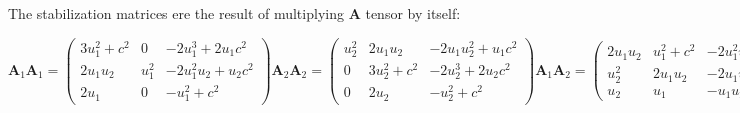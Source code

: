 \documentclass[a4paper,12pt]{article}
\begin{document}
The stabilization matrices ere the result of multiplying $\mathbf{A}$ tensor by itself:

\begin{subequations}
\begin{equation}
\mathbf{A}_1\mathbf{A}_1 =
\begin{pmatrix}
3u_1^2 + c^2 & 0  & -2u_1^3 + 2u_1c^2 \\
2u_1u_2  & u_1^2  & -2u_1^2u_2 + u_2c^2 \\
2u_1  & 0   & -u_1^2 + c^2
\end{pmatrix}
\end{equation}
\begin{equation}
    \mathbf{A}_2\mathbf{A}_2 =
\begin{pmatrix}
u_2^2  & 2u_1u_2  & -2u_1u_2^2 + u_1c^2 \\
0    & 3u_2^2 + c^2 & -2u_2^3 + 2u_2c^2 \\
0  & 2u_2  & -u_2^2 + c^2
\end{pmatrix}
\end{equation}
\begin{equation}
\mathbf{A}_1\mathbf{A}_2 =
\begin{pmatrix}
2u_1u_2  & u_1^2 + c^2  & -2u_1^2u_2 \\
u_2^2  & 2u_1u_2  & -2u_1u_2^2 + u_1c^2 \\
u_2  & u_1  & -u_1u_2
\end{pmatrix}
\end{equation}
\begin{equation}
\mathbf{A}_2\mathbf{A}_1 =
\begin{pmatrix}
2u_1u_2  & u_1^2  & -2u_1^2u_2 + u_2c^2 \\
u_2^2 + c^2  & 2u_1u_2  & -2u_1u_2^2 \\
u_2  & u_1  & -u_1u_2
\end{pmatrix}
\end{equation}
\end{subequations}




\end{document}
